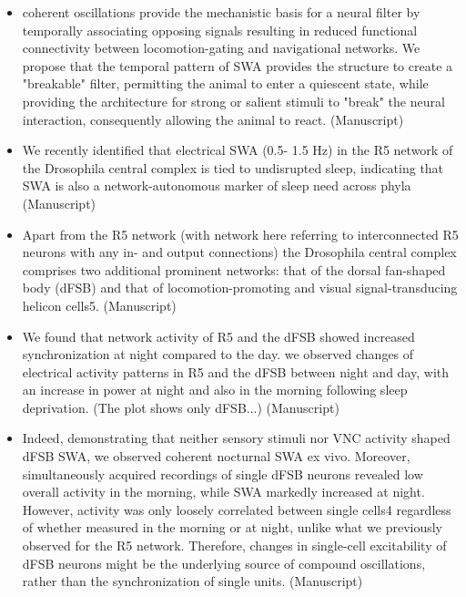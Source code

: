 \documentclass[11pt]{article}
\begin{document}
\begin{itemize}
    \item coherent oscillations provide the mechanistic basis for a neural filter
    by temporally associating opposing signals resulting in reduced functional connectivity
    between locomotion-gating and navigational networks. We propose that the temporal
    pattern of SWA provides the structure to create a "breakable" filter, permitting the animal to
    enter a quiescent state, while providing the architecture for strong or salient stimuli to "break"
    the neural interaction, consequently allowing the animal to react.
    \parencite{raccugliaCoherentMultilevelNetwork2022} (Manuscript)

    \item  We recently identified that electrical SWA (0.5-
    1.5 Hz) in the R5 network of the Drosophila central complex is tied to undisrupted sleep, indicating that SWA is also a network-autonomous marker of sleep need across phyla
    \parencite{raccugliaCoherentMultilevelNetwork2022} (Manuscript)

    \item Apart from the R5
    network (with network here referring to interconnected R5 neurons with any in- and output
    connections) the Drosophila central complex comprises two additional prominent networks:
    that of the dorsal fan-shaped body (dFSB) and that of locomotion-promoting and visual
    signal-transducing helicon cells5.
    \parencite{raccugliaCoherentMultilevelNetwork2022} (Manuscript)

    \item We
    found that network activity of R5 and the dFSB showed increased synchronization at night compared to the day.
    we observed changes of electrical activity patterns in
    R5 and the dFSB between night and day, with an increase in power at night and also in the
    morning following sleep deprivation. (The plot shows only dFSB...)
    \parencite{raccugliaCoherentMultilevelNetwork2022} (Manuscript)

    \item Indeed, demonstrating that neither
    sensory stimuli nor VNC activity shaped dFSB SWA, we observed coherent nocturnal SWA ex
    vivo. Moreover, simultaneously acquired recordings of single dFSB
    neurons revealed low overall activity in the morning, while SWA markedly increased at night.
    However, activity was only loosely correlated between single cells4
    regardless of whether measured in the morning or at night, unlike
    what we previously observed for the R5 network. Therefore, changes in single-cell excitability
    of dFSB neurons might be the underlying source of compound oscillations, rather than the
    synchronization of single units.
    \parencite{raccugliaCoherentMultilevelNetwork2022} (Manuscript)


\end{itemize}
\end{document}
